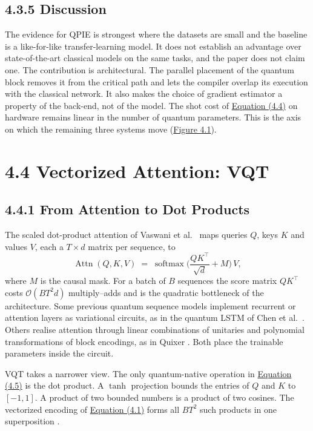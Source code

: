\documentclass{report}
\theoremstyle{plain}
\theoremstyle{definition}
\theoremstyle{remark}
\newcommand{\bigO}[1]{\mathcal{O}\!\left(#1\right)}
\begin{document}
\subsection{4.3.5 Discussion}\label{sec:qml:qpie:discussion}

The evidence for QPIE is strongest where the datasets are small and the baseline is a like-for-like transfer-learning model. It does not establish an advantage over state-of-the-art classical models on the same tasks, and the paper does not claim one. The contribution is architectural. The parallel placement of the quantum block removes it from the critical path and lets the compiler overlap its execution with the classical network. It also makes the choice of gradient estimator a property of the back-end, not of the model. The shot cost of \hyperref[eq:qml:paramshift]{Equation (4.4)} on hardware remains linear in the number of quantum parameters. This is the axis on which the remaining three systems move (\hyperref[fig:qml:overview]{Figure 4.1}).

\section{4.4 Vectorized Attention: VQT}\label{sec:qml:vqt}

\subsection{4.4.1 From Attention to Dot Products}\label{sec:qml:vqt:attention}

The scaled dot-product attention of Vaswani et al.~\cite{vaswani2017attention} maps queries $Q$, keys $K$ and values $V$, each a $T \times d$ matrix per sequence, to
\hypertarget{eq:qml:attention}{}\[
\operatorname{Attn}(Q,K,V) \;=\; \operatorname{softmax}\!\Big(\frac{QK^{\top}}{\sqrt{d}} + M\Big)\,V,
\tag{4.5}\]
where $M$ is the causal mask. For a batch of $B$ sequences the score matrix $QK^\top$ costs $\bigO{BT^2 d}$ multiply--adds and is the quadratic bottleneck of the architecture. Some previous quantum sequence models implement recurrent or attention layers as variational circuits, as in the quantum LSTM of Chen et al.~\cite{chen2022qlstm}. Others realise attention through linear combinations of unitaries and polynomial transformations of block encodings, as in Quixer \cite{khatri2024quixer}. Both place the trainable parameters inside the circuit.

VQT takes a narrower view. The only quantum-native operation in \hyperref[eq:qml:attention]{Equation (4.5)} is the dot product. A $\tanh$ projection bounds the entries of $Q$ and $K$ to $[-1,1]$. A product of two bounded numbers is a product of two cosines. The vectorized encoding of \hyperref[eq:qml:qcrank]{Equation (4.1)} forms all $BT^2$ such products in one superposition \cite{guo2025vqt}.
\end{document}
